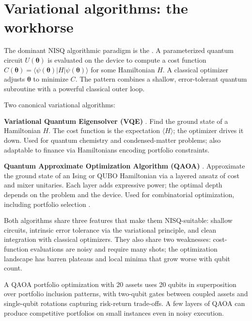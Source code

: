 \section{Variational algorithms: the workhorse}

The dominant NISQ algorithmic paradigm is the  \citep{cerezo_variational_2021}. A parameterized quantum circuit $U(\boldsymbol\theta)$ is evaluated on the device to compute a cost function $C(\boldsymbol\theta) = \langle\psi(\boldsymbol\theta)|H|\psi(\boldsymbol\theta)\rangle$ for some Hamiltonian $H$. A classical optimizer adjusts $\boldsymbol\theta$ to minimize $C$. The pattern combines a shallow, error-tolerant quantum subroutine with a powerful classical outer loop.

Two canonical variational algorithms:

\textbf{Variational Quantum Eigensolver (VQE)} \citep{peruzzo_variational_2014}. Find the ground state of a Hamiltonian $H$. The cost function is the expectation $\langle H\rangle$; the optimizer drives it down. Used for quantum chemistry and condensed-matter problems; also adaptable to finance via Hamiltonians encoding portfolio constraints.

\textbf{Quantum Approximate Optimization Algorithm (QAOA)} \citep{farhi_quantum_2014}. Approximate the ground state of an Ising or QUBO Hamiltonian via a layered ansatz of cost and mixer unitaries. Each layer adds expressive power; the optimal depth depends on the problem and the device. Used for combinatorial optimization, including portfolio selection \citep{zaman_po-qa_2024,thomassin_quantum_2025}.

Both algorithms share three features that make them NISQ-suitable: shallow circuits, intrinsic error tolerance via the variational principle, and clean integration with classical optimizers. They also share two weaknesses: cost-function evaluations are noisy and require many shots; the optimization landscape has barren plateaus and local minima that grow worse with qubit count.

\begin{example}
A QAOA portfolio optimization with 20 assets uses 20 qubits in superposition over portfolio inclusion patterns, with two-qubit gates between coupled assets and single-qubit rotations capturing risk-return trade-offs. A few layers of QAOA can produce competitive portfolios on small instances even in noisy execution.
\end{example}

